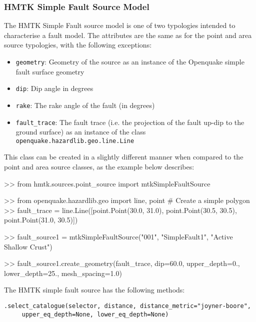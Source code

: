 \subsubsection{HMTK Simple Fault Source Model}

The HMTK Simple Fault source model is one of two typologies intended to characterise a fault model. The attributes are the same as for the point and area source typologies, with the following exceptions:


\begin{itemize}
\item \verb=geometry=: Geometry of the source as an instance of the Openquake simple fault surface geometry
\item \verb=dip=: Dip angle in degrees
\item \verb=rake=: The rake angle of the fault (in degrees)
\item \verb=fault_trace=: The fault trace (i.e. the projection of the fault up-dip to the ground surface) as an instance of the class \verb=openquake.hazardlib.geo.line.Line=
\end{itemize}

This class can be created in a slightly different manner when compared to the point and area source classes, as the example below describes:

\begin{python}[frame=single]
>> from hmtk.sources.point_source import mtkSimpleFaultSource

>> from openquake.hazardlib.geo import line, point
# Create a simple polygon
>> fault_trace = line.Line([point.Point(30.0, 31.0),
                            point.Point(30.5, 30.5),
                            point.Point(31.0, 30.5)]) 

>> fault_source1 = mtkSimpleFaultSource("001",
                                        "SimpleFault1",
                                        "Active Shallow Crust")

>> fault_source1.create_geometry(fault_trace, 
                                 dip=60.0,
                                 upper_depth=0.,
                                 lower_depth=25.,
                                 mesh_spacing=1.0)
\end{python}

The HMTK simple fault source has the following methods:

\verb;.select_catalogue(selector, distance, distance_metric="joyner-boore",;\\
\verb;     upper_eq_depth=None, lower_eq_depth=None);

